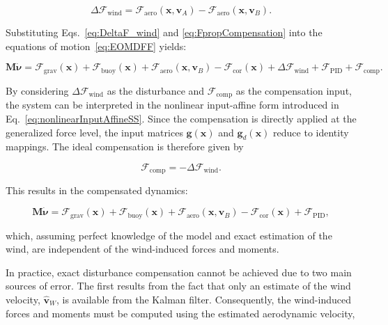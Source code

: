 \begin{equation}
	\Delta \bm{\mathcal{F}}_\mathrm{wind} 
	= 
	\bm{\mathcal{F}}_\mathrm{aero}(\bm{x}, \bm{v}_A) 
	- 
	\bm{\mathcal{F}}_\mathrm{aero}(\bm{x}, \bm{v}_B).
	\label{eq:DeltaF_wind} 
\end{equation}

Substituting Eqs.~\eqref{eq:DeltaF_wind} and \eqref{eq:FpropCompensation} into the equations of motion~\eqref{eq:EOMDFF} yields:

\begin{equation}
	\bm{M}\dot{\bm{\nu}}
	=
	\bm{\mathcal{F}}_\mathrm{grav}(\bm{x}) 
	+ 
	\bm{\mathcal{F}}_\mathrm{buoy}(\bm{x}) 
	+ 
	\bm{\mathcal{F}}_\mathrm{aero}(\bm{x}, \bm{v}_B) 
	- 
	\bm{\mathcal{F}}_\mathrm{cor}(\bm{x})
	+ 
	\Delta \bm{\mathcal{F}}_\mathrm{wind} 
	+ 
	\bm{\mathcal{F}}_\mathrm{PID} 
	+ 
	\bm{\mathcal{F}}_\mathrm{comp}.
\end{equation}

By considering $\Delta \bm{\mathcal{F}}_\mathrm{wind}$ as the disturbance and 
$\bm{\mathcal{F}}_\mathrm{comp}$ as the compensation input, the system can be interpreted in the nonlinear input-affine form introduced in Eq.~\eqref{eq:nonlinearInputAffineSS}. Since the compensation is directly applied at the generalized force level, the input matrices $\bm{g}(\bm{x})$ and $\bm{g}_d(\bm{x})$ reduce to identity mappings. The ideal compensation is therefore given by

\begin{equation}
	\bm{\mathcal{F}}_\mathrm{comp} = -\Delta \bm{\mathcal{F}}_\mathrm{wind}.
\end{equation}

This results in the compensated dynamics:

\begin{equation}
	\bm{M}\dot{\bm{\nu}}
	=
	\bm{\mathcal{F}}_\mathrm{grav}(\bm{x}) 
	+ 
	\bm{\mathcal{F}}_\mathrm{buoy}(\bm{x}) 
	+ 
	\bm{\mathcal{F}}_\mathrm{aero}(\bm{x}, \bm{v}_B) 
	- 
	\bm{\mathcal{F}}_\mathrm{cor}(\bm{x})
	+
	\bm{\mathcal{F}}_\mathrm{PID},
\end{equation}

which, assuming perfect knowledge of the model and exact estimation of the wind, are independent of the wind-induced forces and moments. 

In practice, exact disturbance compensation cannot be achieved due to two main sources of error. The first results from the fact that only an estimate of the wind velocity, $\hat{\bm{v}}_W$, is available from the Kalman filter. Consequently, the wind-induced forces and moments must be computed using the estimated aerodynamic velocity,

